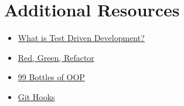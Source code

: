 
\section{Additional Resources}

\begin{itemize}[leftmargin=*]
    \item \href{https://www.freecodecamp.org/news/test-driven-development-what-it-is-and-what-it-is-not-41fa6bca02a2/}{What is Test Driven Development?}
    \item \href{https://www.codecademy.com/articles/tdd-red-green-refactor}{Red, Green, Refactor}
    \item \href{https://www.sandimetz.com/99bottles}{99 Bottles of OOP}
    \item \href{https://git-scm.com/book/en/v2/Customizing-Git-Git-Hooks}{Git Hooks}
\end{itemize}

